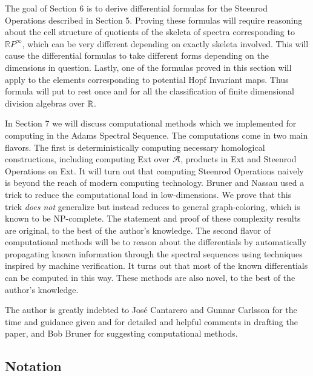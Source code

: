 The goal of Section 6 is to derive differential formulas for the Steenrod Operations described in Section 5.
Proving these formulas will require reasoning about the cell structure of quotients of the skeleta of spectra corresponding to $\mathbb{R}P^\infty$, which can be very different depending on exactly skeleta involved.
This will cause the differential formulas to take different forms depending on the dimensions in question.
Lastly, one of the formulas proved in this section will apply to the elements corresponding to potential Hopf Invariant maps. 
Thus formula will put to rest once and for all the classification of finite dimensional division algebras over $\mathbb{R}$.  

In Section 7 we will discuss computational methods which we implemented for computing in the Adams Spectral Sequence.
The computations come in two main flavors.  
The first is deterministically computing necessary homological constructions, including computing Ext over $\mathcal{A}$, products in Ext and Steenrod Operations on Ext.
It will turn out that computing Steenrod Operations naively is beyond the reach of modern computing technology.
Bruner and Nassau used a trick to reduce the computational load in low-dimensions.
We prove that this trick \emph{does not} generalize but instead reduces to general graph-coloring, which is known to be NP-complete.
The statement and proof of these complexity results are original, to the best of the author's knowledge.  
The second flavor of computational methods will be to reason about the differentials by automatically propagating known information through the spectral sequences using techniques inspired by machine verification.  
It turns out that most of the known differentials can be computed in this way.  
These methods are also novel, to the best of the author's knowledge.  

The author is greatly indebted to Jos\'e Cantarero and Gunnar Carlsson for the time and guidance given and for detailed and helpful comments in drafting the paper, 
and Bob Bruner for suggesting computational methods.  



\subsection{Notation}

